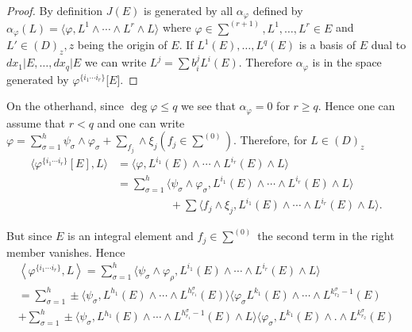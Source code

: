 \begin{proof}
  By definition $J(E)$ is generated by all $\alpha_\varphi$ defined by
  $\alpha_ \varphi (L) = \langle \varphi,  L^1 \wedge \cdots \wedge
  L^r \wedge L \rangle$ where $ \varphi \in \sum^{(r+1)},  L^1,
  \ldots ,  L^r \in E $ and $L' \in (D)_z,  z$ being the origin of
  $E$. If $L^1 (E),  \ldots,  L^q (E)$ is  a basis of $E$ dual to
  $dx_1 \big | E,  \ldots,  dx_q \big | E$ we can write $L^j = \sum
  b^j_i L^i (E)$. Therefore $\alpha_\varphi$ is in the space generated
  by $\varphi^{\{i_1 \cdots i_r\}} $[$E$]. 
\end{proof}

On the otherhand,  since $\deg \varphi \le q$ we see that $\alpha_
\varphi = 0$ for $r \ge q$. Hence one can assume that $r < q$ and one
can write $\varphi = \sum\limits^{h}_{\sigma = 1} \psi_\sigma \wedge
\varphi_\sigma + \sum_{f_j} \wedge \xi_j (f_j \in
\sum^{(0)})$. Therefore,  for $L \in (D)_z$ 
\begin{align*}
  \langle \varphi^{\{i _1  \cdots i_r \}} [E],  L \rangle & = \langle
  \varphi,  L^{i_1} (E) \wedge \cdots \wedge L^{i_r} (E) \wedge L
  \rangle\\ 
  & = \sum^{h}_{\sigma = 1} \langle \psi_\sigma \wedge \varphi_\sigma,
  L^{i_1} (E) \wedge \cdots \wedge L^{i_r}(E) \wedge  L \rangle\\ 
  & \hspace{2cm}+  \sum \langle f_j \wedge \xi_j,   L^{i_1} (E) \wedge \cdots
  \wedge L^{i_r}(E) \wedge  L \rangle. 
\end{align*}\pageoriginale

But since $E$ is an integral element and $f_j \in \sum^{(0)}$ the
second term in the right member vanishes. Hence 
\begin{multline*}
  \left\langle \varphi^{\{i_1 \cdots i_r\}},  L \right\rangle = \sum_{\sigma = 1}^h
  \langle \psi_\sigma \wedge \varphi_\rho,  L^{i_1} (E) \wedge \cdots
  \wedge L^{i_r} (E) \wedge L \rangle\\ 
  = \sum_{\sigma = 1}^h \pm \langle \psi_\sigma,  L^{h_1} (E) \wedge \cdots
  \wedge L^{h_{r_1}^\sigma}  (E) \rangle \langle \varphi_\sigma L^{k_1}(E)
  \wedge \cdots \wedge L{}^{k_{r_2}^\sigma-1} (E)\\ 
  + \sum_{\sigma = 1}^h \pm
  \langle \psi_\sigma, L {}^{h_1} (E) \wedge \cdots \wedge
  L{}^{h_{r_1}^\sigma-1} (E) \wedge L \rangle \langle \varphi_\sigma,
  L^{k_1}(E) \wedge . \wedge L{}^{k_{r_2}^\sigma} (E) 
\end{multline*}

